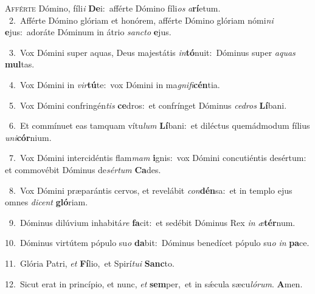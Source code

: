 \lettrine{\initial\textcolor{\initialcolor}{A}}{fférte} Dómino, fíli\textit{i} \textbf{De}\-i:~\star afférte Dómino fíli\textit{os} \textit{a}\-\textbf{rí}etum.\\
{\numbfont\textcolor{\numbcolor}{~2.}}~Afférte Dómino glóriam et honórem, afférte Dómino glóriam nómi\textit{ni} \textbf{e}\-jus:~\star adoráte Dóminum in átrio \textit{sanc}\-\textit{to} \textbf{e}\-jus.\par
{\numbfont\textcolor{\numbcolor}{~3.}}~Vox Dómini super aquas, Deus majestátis \textit{in}\-\textbf{tó}nuit:~\star Dóminus super \textit{a}\-\textit{quas} \textbf{mul}\-tas.\par
{\numbfont\textcolor{\numbcolor}{~4.}}~Vox Dómini in \textit{vir}\-\textbf{tú}te:~\star vox Dómini in ma\-\textit{gni}\-\textit{fi}\textbf{cén}tia.\par
{\numbfont\textcolor{\numbcolor}{~5.}}~Vox Dómini confringén\textit{tis} \textbf{ce}\-dros:~\star et confrínget Dóminus \textit{ce}\-\textit{dros} \textbf{Lí}\-bani.\par
{\numbfont\textcolor{\numbcolor}{~6.}}~Et commínuet eas tamquam vítu\textit{lum} \textbf{Lí}\-bani:~\star et diléctus quemádmodum fílius \textit{u}\-\textit{ni}\textbf{cór}nium.\par
{\numbfont\textcolor{\numbcolor}{~7.}}~Vox Dómini intercidéntis flam\textit{mam} \textbf{i}\-gnis:~\star vox Dómini concutiéntis desértum: et commovébit Dóminus de\-\textit{sér}\-\textit{tum} \textbf{Ca}\-des.\par
{\numbfont\textcolor{\numbcolor}{~8.}}~Vox Dómini præparántis cervos, et revelábit \textit{con}\-\textbf{dén}sa:~\star et in templo ejus omnes \textit{di}\-\textit{cent} \textbf{gló}\-riam.\par
{\numbfont\textcolor{\numbcolor}{~9.}}~Dóminus dilúvium inhabitá\textit{re} \textbf{fa}\-cit:~\star et sedébit Dóminus Rex \textit{in} \textit{æ}\-\textbf{tér}num.\par
{\numbfont\textcolor{\numbcolor}{10.}}~Dóminus virtútem pópulo su\textit{o} \textbf{da}\-bit:~\star Dóminus benedícet pópulo su\textit{o} \textit{in} \textbf{pa}\-ce.\par
{\numbfont\textcolor{\numbcolor}{11.}}~Glória Patri, \textit{et} \textbf{Fí}\-lio,~\star et Spirí\-\textit{tu}\-\textit{i} \textbf{Sanc}\-to.\par
{\numbfont\textcolor{\numbcolor}{12.}}~Sicut erat in princípio, et nunc, \textit{et} \textbf{sem}\-per,~\star et in sǽcula sæcu\-\textit{ló}\-\textit{rum}. \textbf{A}\-men.\par
